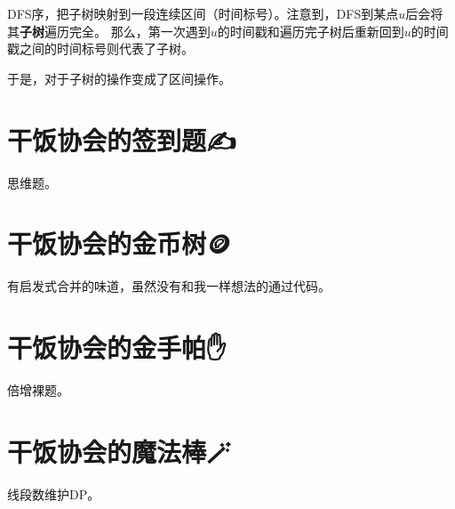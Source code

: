 \documentclass[11pt, UTF8]{ctexart}
\theoremstyle{mystyle} %
\begin{document}
DFS序，把子树映射到一段连续区间（时间标号）。注意到，DFS到某点$u$后会将其\textbf{子树}遍历完全。
那么，第一次遇到$u$的时间戳和遍历完子树后重新回到$u$的时间戳之间的时间标号则代表了子树。\par
于是，对于子树的操作变成了区间操作。

\section{干饭协会的签到题{\EmojiFont ✍}}

思维题。

\section{干饭协会的金币树{\EmojiFont 🪙}}

有启发式合并的味道，虽然没有和我一样想法的通过代码。

\section{干饭协会的金手帕{\EmojiFont ✋}}

倍增裸题。

\section{干饭协会的魔法棒{\EmojiFont 🪄}}

线段数维护DP。
\end{document}

